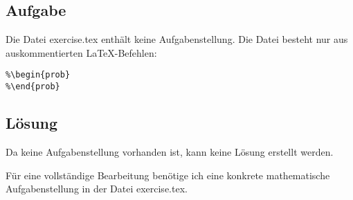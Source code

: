 \documentclass{article}
\begin{document}
\subsection*{Aufgabe}
Die Datei exercise.tex enthält keine Aufgabenstellung. Die Datei besteht nur aus auskommentierten LaTeX-Befehlen:
\begin{verbatim}
%\begin{prob} 
%\end{prob}
\end{verbatim}

\subsection*{Lösung}
Da keine Aufgabenstellung vorhanden ist, kann keine Lösung erstellt werden. 

Für eine vollständige Bearbeitung benötige ich eine konkrete mathematische Aufgabenstellung in der Datei exercise.tex.
\end{document}
